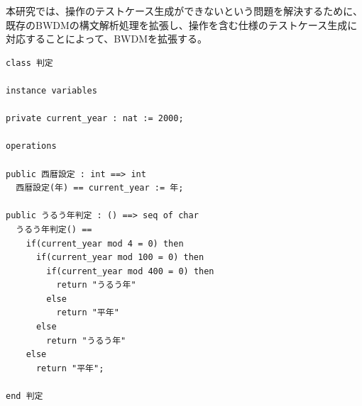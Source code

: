 \documentclass[uplatex, report, a4j, 10pt]{jsbook}
\newcommand{\tool}{BWDM}
\begin{document}
本研究では、操作のテストケース生成ができないという問題を解決するために、既存の\tool{}の構文解析処理を拡張し、操作を含む仕様のテストケース生成に対応することによって、\tool{}を拡張する。

\lstset{language=}
\noindent\begin{minipage}{\textwidth}
  \begin{lstlisting}[caption=操作を含むVDM++仕様,label=fig:multiple_definition]
class 判定

instance variables

private current_year : nat := 2000;

operations

public 西暦設定 : int ==> int
  西暦設定(年) == current_year := 年;

public うるう年判定 : () ==> seq of char
  うるう年判定() ==
    if(current_year mod 4 = 0) then
      if(current_year mod 100 = 0) then
        if(current_year mod 400 = 0) then
          return "うるう年"
        else
          return "平年"
      else
        return "うるう年"
    else
      return "平年";

end 判定
\end{lstlisting}
\end{minipage}

\end{document}
